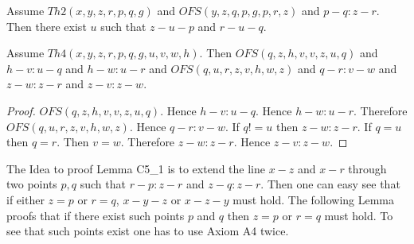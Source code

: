 \documentclass{article}
\begin{document}
\begin{forthel}
    \begin{lemma}[C5_1n]
      Assume $Th2(x,y,z,r,p,q,g)$ and $OFS(y,z,q,p,g,p,r,z)$ and $p-q : z-r$. Then there exist $u$ such that $z-u-p$ and $r-u-q$.
    \end{lemma}

    \begin{lemma}[C5_1o]
      Assume $Th4(x,y,z,r,p,q,g,u,v,w,h)$. Then $OFS(q,z,h,v,v,z,u,q)$ and $h-v : u-q$ and $h-w : u-r$ and $OFS(q,u,r,z,v,h,w,z)$ and $q-r : v-w$ and $z-w : z-r$ and $z-v : z-w$.
    \end{lemma}
    \begin{proof}
    	$OFS(q,z,h,v,v,z,u,q)$. Hence $h-v : u-q$.
      Hence $h-w : u-r$. %
    	Therefore $OFS(q,u,r,z,v,h,w,z)$. Hence $q-r : v-w$. If $q != u$ then $z-w : z-r$.
      If $q = u$ then $q = r$. %
    	Then $v = w$. Therefore $z-w : z-r$. Hence $z-v : z-w$.
    \end{proof}
  \end{forthel}

  The Idea to proof Lemma C5_1 is to extend the line $x-z$ and $x-r$ through two points $p,q$ such that $r-p : z-r$ and $z-q : z-r$. Then one can easy see that if either $z = p$ or $r = q$, $x-y-z$ or $x-z-y$ must hold. The following Lemma proofs that if there exist such points $p$ and $q$ then $z = p$ or $r = q$ must hold. To see that such points exist one has to use Axiom A4 twice.
\end{document}

